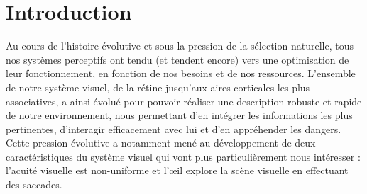 
\chapter{Introduction} %
\label{Introduction} %


\newcommand{\keyword}[1]{\textbf{#1}}
\newcommand{\tabhead}[1]{\textbf{#1}}
\newcommand{\code}[1]{\texttt{#1}}
\newcommand{\file}[1]{\texttt{\bfseries#1}}
\newcommand{\option}[1]{\texttt{\itshape#1}}


Au cours de l'histoire évolutive et sous la pression de la sélection naturelle, tous nos systèmes perceptifs ont tendu (et tendent encore) vers une optimisation de leur fonctionnement, en fonction de nos besoins et de nos ressources.
L'ensemble de notre système visuel, de la rétine jusqu'aux aires corticales les plus associatives, a ainsi évolué pour pouvoir réaliser une description robuste et rapide de notre environnement, nous permettant d'en intégrer les informations les plus pertinentes, d'interagir efficacement avec lui et d'en appréhender les dangers.
Cette pression évolutive a notamment mené au développement de deux caractéristiques du système visuel qui vont plus particulièrement nous intéresser : l'acuité visuelle est non-uniforme et l'\oe il explore la scène visuelle en effectuant des saccades.~\autocite{Werner2014} \\

